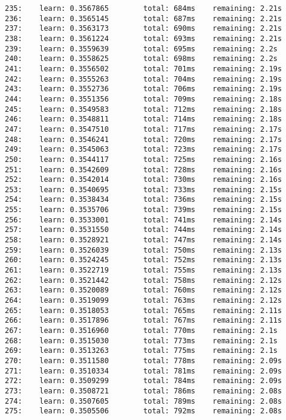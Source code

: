 \documentclass[11pt]{article}
\begin{document}
\begin{Verbatim}[commandchars=\\\{\}]
235:    learn: 0.3567865        total: 684ms    remaining: 2.21s
236:    learn: 0.3565145        total: 687ms    remaining: 2.21s
237:    learn: 0.3563173        total: 690ms    remaining: 2.21s
238:    learn: 0.3561224        total: 693ms    remaining: 2.21s
239:    learn: 0.3559639        total: 695ms    remaining: 2.2s
240:    learn: 0.3558625        total: 698ms    remaining: 2.2s
241:    learn: 0.3556502        total: 701ms    remaining: 2.19s
242:    learn: 0.3555263        total: 704ms    remaining: 2.19s
243:    learn: 0.3552736        total: 706ms    remaining: 2.19s
244:    learn: 0.3551356        total: 709ms    remaining: 2.18s
245:    learn: 0.3549583        total: 712ms    remaining: 2.18s
246:    learn: 0.3548811        total: 714ms    remaining: 2.18s
247:    learn: 0.3547510        total: 717ms    remaining: 2.17s
248:    learn: 0.3546241        total: 720ms    remaining: 2.17s
249:    learn: 0.3545063        total: 723ms    remaining: 2.17s
250:    learn: 0.3544117        total: 725ms    remaining: 2.16s
251:    learn: 0.3542609        total: 728ms    remaining: 2.16s
252:    learn: 0.3542014        total: 730ms    remaining: 2.16s
253:    learn: 0.3540695        total: 733ms    remaining: 2.15s
254:    learn: 0.3538434        total: 736ms    remaining: 2.15s
255:    learn: 0.3535706        total: 739ms    remaining: 2.15s
256:    learn: 0.3533001        total: 741ms    remaining: 2.14s
257:    learn: 0.3531550        total: 744ms    remaining: 2.14s
258:    learn: 0.3528921        total: 747ms    remaining: 2.14s
259:    learn: 0.3526039        total: 750ms    remaining: 2.13s
260:    learn: 0.3524245        total: 752ms    remaining: 2.13s
261:    learn: 0.3522719        total: 755ms    remaining: 2.13s
262:    learn: 0.3521442        total: 758ms    remaining: 2.12s
263:    learn: 0.3520089        total: 760ms    remaining: 2.12s
264:    learn: 0.3519099        total: 763ms    remaining: 2.12s
265:    learn: 0.3518053        total: 765ms    remaining: 2.11s
266:    learn: 0.3517896        total: 767ms    remaining: 2.11s
267:    learn: 0.3516960        total: 770ms    remaining: 2.1s
268:    learn: 0.3515030        total: 773ms    remaining: 2.1s
269:    learn: 0.3513263        total: 775ms    remaining: 2.1s
270:    learn: 0.3511580        total: 778ms    remaining: 2.09s
271:    learn: 0.3510334        total: 781ms    remaining: 2.09s
272:    learn: 0.3509299        total: 784ms    remaining: 2.09s
273:    learn: 0.3508721        total: 786ms    remaining: 2.08s
274:    learn: 0.3507605        total: 789ms    remaining: 2.08s
275:    learn: 0.3505506        total: 792ms    remaining: 2.08s

\end{Verbatim}
\end{document}
